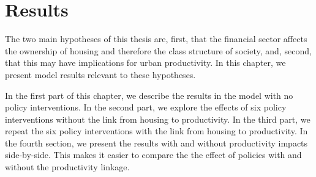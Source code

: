 \chapter{Results} \label{chapter-results}

The two main hypotheses of this thesis are, first, that the financial sector affects the ownership of housing and therefore the class structure of society, and, second, that this may have implications for urban productivity.  In this chapter, we present model results relevant to these hypotheses.

In the first part of this chapter, we describe the results in the model with no policy interventions. In the second part, we explore the effects of six policy interventions without the link from housing to productivity. In the third part, we repeat the six policy interventions with the link from housing to productivity.  %
In the fourth section, we present the results with and without productivity impacts side-by-side. This makes it easier to compare the the effect of policies with and without the productivity linkage. 

